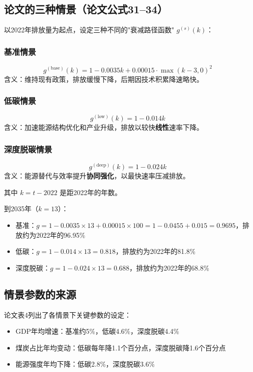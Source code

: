 \documentclass[12pt, a4paper]{article}
\begin{document}
\subsection{论文的三种情景（论文公式31--34）}

以2022年排放量为起点，设定三种不同的"衰减路径函数" $g^{(s)}(k)$：

\subsubsection{基准情景}
\[
g^{(\text{base})}(k) = 1 - 0.0035k + 0.00015 \cdot \max(k-3, 0)^2
\]
含义：维持现有政策，排放缓慢下降，后期因技术积累降速略快。

\subsubsection{低碳情景}
\[
g^{(\text{low})}(k) = 1 - 0.014k
\]
含义：加速能源结构优化和产业升级，排放以较快\textbf{线性}速率下降。

\subsubsection{深度脱碳情景}
\[
g^{(\text{deep})}(k) = 1 - 0.024k
\]
含义：能源替代与效率提升\textbf{协同强化}，以最快速率压减排放。

其中 $k = t - 2022$ 是距2022年的年数。

\begin{examplebox}[算一算]
到2035年（$k=13$）：
\begin{itemize}[leftmargin=2em]
\item 基准：$g = 1 - 0.0035 \times 13 + 0.00015 \times 100 = 1 - 0.0455 + 0.015 = 0.9695$，排放约为2022年的96.95\%
\item 低碳：$g = 1 - 0.014 \times 13 = 0.818$，排放约为2022年的81.8\%
\item 深度脱碳：$g = 1 - 0.024 \times 13 = 0.688$，排放约为2022年的68.8\%
\end{itemize}
\end{examplebox}

\subsection{情景参数的来源}

论文表4列出了各情景下关键参数的设定：
\begin{itemize}[leftmargin=2em]
\item GDP年均增速：基准约5\%，低碳4.6\%，深度脱碳4.4\%
\item 煤炭占比年均变动：低碳每年降1.1个百分点，深度脱碳降1.6个百分点
\item 能源强度年均下降：低碳2.8\%，深度脱碳3.6\%
\end{itemize}
\end{document}
